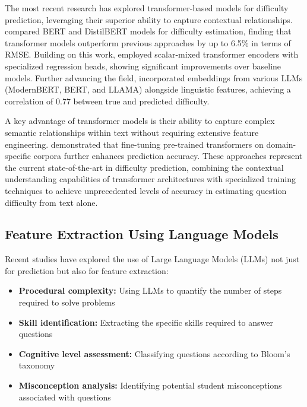 \documentclass[
    a4paper, %
    10pt, %
    twoside, %
]{LTJournalArticle}
\begin{document}
The most recent research has explored transformer-based models for difficulty prediction, leveraging their superior ability to capture contextual relationships. \textcite{benedetto2021transformers} compared BERT and DistilBERT models for difficulty estimation, finding that transformer models outperform previous approaches by up to 6.5\% in terms of RMSE. Building on this work, \textcite{gombert2024predicting} employed scalar-mixed transformer encoders with specialized regression heads, showing significant improvements over baseline models. Further advancing the field, \textcite{kapoor2025prediction} incorporated embeddings from various LLMs (ModernBERT, BERT, and LLAMA) alongside linguistic features, achieving a correlation of 0.77 between true and predicted difficulty.

A key advantage of transformer models is their ability to capture complex semantic relationships within text without requiring extensive feature engineering. \textcite{aradelli2020transformers} demonstrated that fine-tuning pre-trained transformers on domain-specific corpora further enhances prediction accuracy. These approaches represent the current state-of-the-art in difficulty prediction, combining the contextual understanding capabilities of transformer architectures with specialized training techniques to achieve unprecedented levels of accuracy in estimating question difficulty from text alone.

\subsection{Feature Extraction Using Language Models}

Recent studies have explored the use of Large Language Models (LLMs) not just for prediction but also for feature extraction:

\begin{itemize}
    \item \textbf{Procedural complexity:} Using LLMs to quantify the number of steps required to solve problems \textcite{liu2023improving}
    \item \textbf{Skill identification:} Extracting the specific skills required to answer questions \textcite{didolkar2024metacognitive}
    \item \textbf{Cognitive level assessment:} Classifying questions according to Bloom's taxonomy \textcite{scaria2024automated}
    \item \textbf{Misconception analysis:} Identifying potential student misconceptions associated with questions \textcite{sadihin2024proposalml}
\end{itemize}
\end{document}
